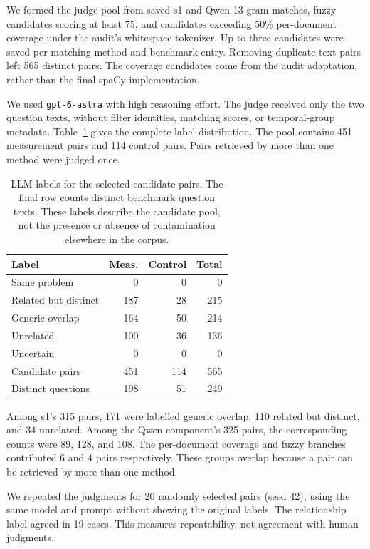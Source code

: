 \documentclass[11pt]{article}
\begin{document}
We formed the judge pool from saved s1 and Qwen 13-gram matches, fuzzy candidates scoring at least 75, and candidates exceeding 50\% per-document coverage under the audit's whitespace tokenizer. Up to three candidates were saved per matching method and benchmark entry. Removing duplicate text pairs left 565 distinct pairs. The coverage candidates come from the audit adaptation, rather than the final spaCy implementation.

We used \texttt{gpt-6-astra} with high reasoning effort. The judge received only the two question texts, without filter identities, matching scores, or temporal-group metadata. Table~\ref{tab:judge-labels} gives the complete label distribution. The pool contains 451 measurement pairs and 114 control pairs. Pairs retrieved by more than one method were judged once.

\begin{table}[!t]
\centering
\small
\setlength{\tabcolsep}{4pt}
\begin{tabular}{@{}lrrr@{}}
\toprule
Label & Meas. & Control & Total \\
\midrule
Same problem         & 0   & 0   & 0 \\
Related but distinct & 187 & 28  & 215 \\
Generic overlap      & 164 & 50  & 214 \\
Unrelated            & 100 & 36  & 136 \\
Uncertain            & 0   & 0   & 0 \\
\midrule
Candidate pairs      & 451 & 114 & 565 \\
Distinct questions   & 198 & 51  & 249 \\
\bottomrule
\end{tabular}
\caption{LLM labels for the selected candidate pairs. The final row counts distinct benchmark question texts. These labels describe the candidate pool, not the presence or absence of contamination elsewhere in the corpus.}
\label{tab:judge-labels}
\end{table}

Among s1's 315 pairs, 171 were labelled generic overlap, 110 related but distinct, and 34 unrelated. Among the Qwen component's 325 pairs, the corresponding counts were 89, 128, and 108. The per-document coverage and fuzzy branches contributed 6 and 4 pairs respectively. These groups overlap because a pair can be retrieved by more than one method.

We repeated the judgments for 20 randomly selected pairs (seed 42), using the same model and prompt without showing the original labels. The relationship label agreed in 19 cases. This measures repeatability, not agreement with human judgments.
\end{document}
